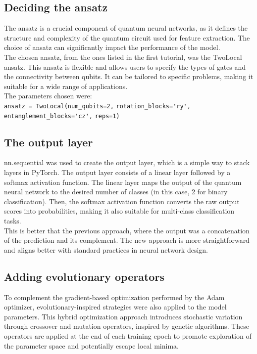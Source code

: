 \documentclass[conference]{IEEEtran}
\begin{document}
\subsection*{\fontsize{12}{16}\selectfont Deciding the ansatz}

\noindent
The ansatz is a crucial component of quantum neural networks, as it defines the structure and complexity of the quantum circuit used for feature extraction. The choice of ansatz can significantly impact the performance of the model.\\
The chosen ansatz, from the ones listed in the first tutorial, was the TwoLocal ansatz. This ansatz is flexible and allows users to specify the types of gates and the connectivity between qubits. It can be tailored to specific problems, making it suitable for a wide range of applications.\\
The parameters chosen were:\\

\noindent
\verb|ansatz = TwoLocal(num_qubits=2,|
\verb|rotation_blocks='ry',|
\verb|entanglement_blocks='cz',|
\verb|reps=1)|



\subsection*{\fontsize{12}{16}\selectfont The output layer}

\noindent
nn.sequential \cite{pytorch_sequential} was used to create the output layer, which is a simple way to stack layers in PyTorch. The output layer consists of a linear layer followed by a softmax \cite{pytorch_softmax} activation function. The linear layer maps the output of the quantum neural network to the desired number of classes (in this case, 2 for binary classification). Then, the softmax activation function converts the raw output scores into probabilities, making it also suitable for multi-class classification tasks.\\
This is better that the previous approach, where the output was a concatenation of the prediction and its complement. The new approach is more straightforward and aligns better with standard practices in neural network design.


\subsection*{\fontsize{12}{16}\selectfont Adding evolutionary operators}
\noindent
To complement the gradient-based optimization performed by the Adam optimizer, evolutionary-inspired strategies were also applied to the model parameters. This hybrid optimization approach introduces stochastic variation through crossover and mutation operators, inspired by genetic algorithms. These operators are applied at the end of each training epoch to promote exploration of the parameter space and potentially escape local minima.\\
\end{document}
